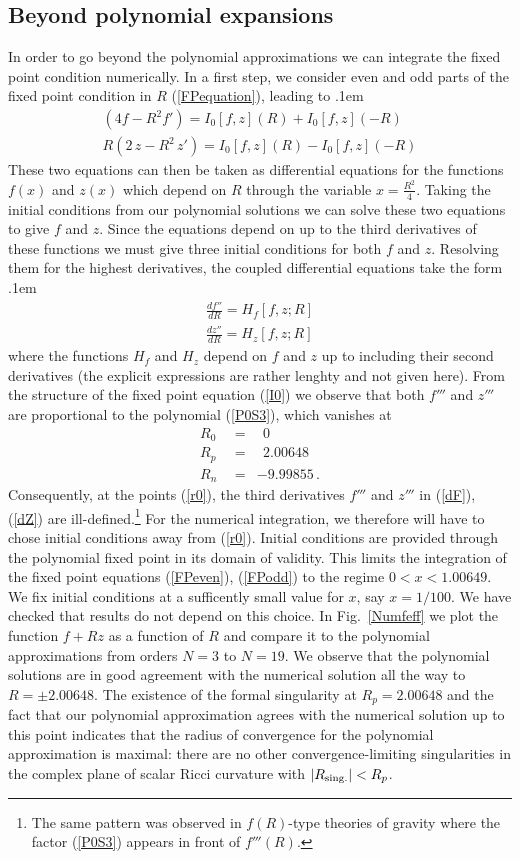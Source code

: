 \documentclass[notitlepage,eqsecnum,bm,amsmath,preprintnumbers,superscriptaddress,nofootinbib,aps,11pt]{revtex4-1}
\def\eq#1{(\ref{#1})}
\def\R{\rho}
\def\R{R}
\def\bea{\arraycolsep .1em \begin{eqnarray}}
\def\eea{\end{eqnarray}}
\begin{document}
\subsection{Beyond polynomial expansions}

In order to go beyond the polynomial approximations we can integrate the fixed point condition numerically. In a first step, we consider even and odd parts of the fixed point condition in $\R$ \eq{FPequation}, leading to
\bea
\label{FPeven}
\left(4 f-\R^2f'
\right)=I_0[f,z](\R)+I_0[f,z](-\R)\\
\label{FPodd}
\R \left(2\,  z-\R^2 \,  z' 
\right)=I_0[f,z](\R)-I_0[f,z](-\R)
\eea
These two equations can then be taken as differential equations for the functions $f(x)$ and $z(x)$ which depend on $\R$ through the variable $x= \frac{\R^2}{4}$. Taking the initial conditions from our polynomial solutions we can solve these two equations to give $f$ and $z$. Since the equations depend on up to the third derivatives of these functions we must give three initial conditions for both $f$ and $z$. Resolving them for the highest derivatives, the coupled differential equations take the form
\bea
\label{dF}
\frac{df''}{d\R}=H_f[f,z;\R]\\
\label{dZ}
\frac{dz''}{d\R}=H_z[f,z;\R]
\eea
where the functions $H_f$ and $H_z$ depend on $f$ and $z$ up to including their second derivatives (the explicit expressions are rather lenghty and not given here). 
From the structure of the fixed point equation \eq{I0} we observe that both $f'''$ and $z'''$ are proportional to the polynomial \eq{P0S3}, which vanishes at
\begin{eqnarray}
\R_0\ \ &=&\ \ 0\nonumber\\
\R_p\ \ &=&\ \ 2.00648\label{r0}\\
\R_n\ \ &=&-9.99855\,.\nonumber
\end{eqnarray}
Consequently, at the points \eq{r0}, the third derivatives $f'''$ and $z'''$ in \eq{dF}, \eq{dZ}  are ill-defined.\footnote{The same pattern was observed in $f(R)$-type theories of gravity where the factor \eq{P0S3} appears in front of $f'''(\R)$.}
For the numerical integration, we therefore will have to chose initial conditions away from \eq{r0}. 
Initial conditions are provided through the polynomial fixed point in its domain of validity. This  limits the integration of the fixed point equations \eq{FPeven}, \eq{FPodd} to the regime $0<x<1.00649$. We fix initial conditions at a sufficently small value for $x$, say $x=1/100$. We have checked that results do not depend on this choice.
 In Fig.~\ref{Numfeff} we plot the function $f+ \R z$ as a function of $\R$ and compare it to the polynomial approximations from orders $N=3$ to $N=19$. We observe that the polynomial solutions are in good agreement with the numerical solution all the way to $\R = \pm2.00648$. 
The existence of the formal singularity at $\R_p =2.00648$ and the fact that our polynomial approximation agrees with the numerical solution up to this point indicates that the radius of convergence for the polynomial approximation is maximal: there are no other convergence-limiting singularities in the complex plane of scalar Ricci curvature with $|\R_{\rm sing.}|<\R_p$.
 
\end{document}
